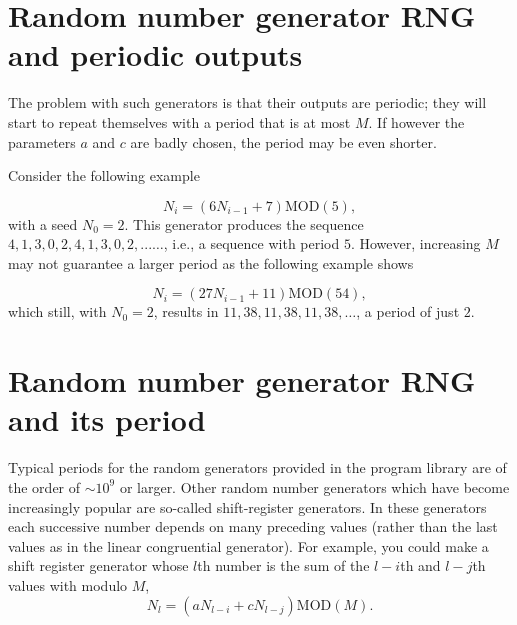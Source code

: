 \documentclass[%
oneside,                 %
final,                   %
10pt]{article}
\newenvironment{block_mdfboxadmon}[1][]{
\begin{block_mdfboxmdframed}[frametitle=#1]
}
{
\end{block_mdfboxmdframed}
}
\begin{document}
\section{Random number generator RNG and periodic outputs}

\begin{block_mdfboxadmon}[]

The problem with such generators is that their outputs are periodic;
they 
will start to repeat themselves with a period that is at most $M$. If however
the parameters $a$ and $c$ are badly chosen, the period may be even shorter.

Consider the following example

\begin{equation*}
  N_i=(6N_{i-1}+7) \mathrm{MOD} (5),
\end{equation*}
with a seed $N_0=2$. This generator produces the sequence
$4,1,3,0,2,4,1,3,0,2,...\dots$, i.e., a sequence with period $5$.
However, increasing $M$ may not guarantee a larger period as the following
example shows

\begin{equation*}
  N_i=(27N_{i-1}+11) \mathrm{MOD} (54),
\end{equation*}
which still, with $N_0=2$, results in $11,38,11,38,11,38,\dots$, a period of
just $2$.
\end{block_mdfboxadmon} %



\section{Random number generator RNG and its period}

\begin{block_mdfboxadmon}[]
Typical periods for the random generators provided in the program library 
are of the order of $\sim 10^9$ or larger. Other random number generators which have
become increasingly popular are so-called shift-register generators.
In these generators each successive number depends on many preceding
values (rather than the last values as in the linear congruential
generator).
For example, you could make a shift register generator whose $l$th 
number is the sum of the $l-i$th and $l-j$th values with modulo $M$,
\begin{equation*}
   N_l=(aN_{l-i}+cN_{l-j})\mathrm{MOD}(M).
\end{equation*}
\end{block_mdfboxadmon} %
\end{document}
